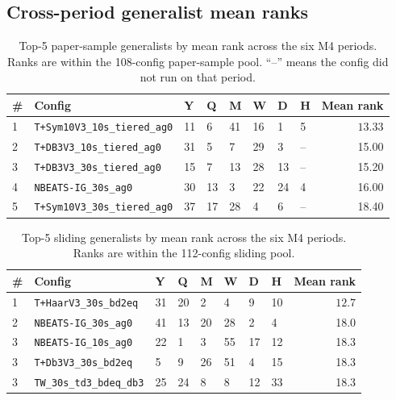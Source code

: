 \documentclass[11pt,a4paper]{article}
\begin{document}
\subsection{Cross-period generalist mean ranks}
\label{app:m4_tables:generalists}

\begin{table}[h]
\centering
\scriptsize
\setlength{\tabcolsep}{3pt}
\caption{Top-5 paper-sample generalists by mean rank across the six M4 periods. Ranks are within the 108-config paper-sample pool. ``--'' means the config did not run on that period.}
\label{tab:generalist_paper}
\begin{tabular}{@{}llllllllr@{}}
\toprule
\# & Config & Y & Q & M & W & D & H & Mean rank \\
\midrule
1 & \texttt{T+Sym10V3\_10s\_tiered\_ag0} & 11 & 6  & 41 & 16 & 1  & 5 & $\mathbf{13.33}$ \\
2 & \texttt{T+DB3V3\_10s\_tiered\_ag0}   & 31 & 5  & 7  & 29 & 3  & -- & 15.00 \\
3 & \texttt{T+DB3V3\_30s\_tiered\_ag0}   & 15 & 7  & 13 & 28 & 13 & -- & 15.20 \\
4 & \texttt{NBEATS-IG\_30s\_ag0}         & 30 & 13 & 3  & 22 & 24 & 4 & 16.00 \\
5 & \texttt{T+Sym10V3\_30s\_tiered\_ag0} & 37 & 17 & 28 & 4  & 6  & -- & 18.40 \\
\bottomrule
\end{tabular}
\end{table}

\begin{table}[h]
\centering
\scriptsize
\setlength{\tabcolsep}{3pt}
\caption{Top-5 sliding generalists by mean rank across the six M4 periods. Ranks are within the 112-config sliding pool.}
\label{tab:generalist_sliding}
\begin{tabular}{@{}llllllllr@{}}
\toprule
\# & Config & Y & Q & M & W & D & H & Mean rank \\
\midrule
1 & \texttt{T+HaarV3\_30s\_bd2eq}         & 31 & 20 & 2  & 4  & 9  & 10 & $\mathbf{12.7}$ \\
2 & \texttt{NBEATS-IG\_30s\_ag0}          & 41 & 13 & 20 & 28 & 2  & 4  & 18.0 \\
3 & \texttt{NBEATS-IG\_10s\_ag0}          & 22 & 1  & 3  & 55 & 17 & 12 & 18.3 \\
3 & \texttt{T+Db3V3\_30s\_bd2eq}          & 5  & 9  & 26 & 51 & 4  & 15 & 18.3 \\
3 & \texttt{TW\_30s\_td3\_bdeq\_db3}      & 25 & 24 & 8  & 8  & 12 & 33 & 18.3 \\
\bottomrule
\end{tabular}
\end{table}
\end{document}
